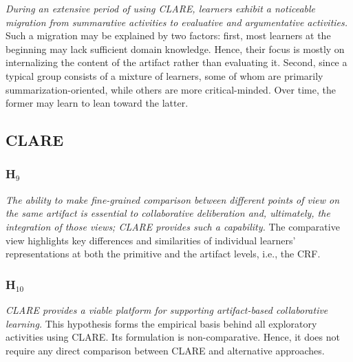 {\it During an extensive period of using CLARE, learners exhibit a
noticeable migration from summarative activities to evaluative and
argumentative activities.} Such a migration may be explained by two
factors: first, most learners at the beginning may lack sufficient domain
knowledge.  Hence, their focus is mostly on internalizing the content of
the artifact rather than evaluating it. Second, since a typical group
consists of a mixture of learners, some of whom are primarily
summarization-oriented, while others are more critical-minded.  Over time,
the former may learn to lean toward the latter.


\subsection{CLARE}
\label{sec:clare hypothesis}

\subsubsection{H\(_9\)}
\label{sec:CLARE1}

{\it The ability to make fine-grained comparison between different points
of view on the same artifact is essential to collaborative deliberation
and, ultimately, the integration of those views; CLARE provides such a
capability.} The comparative view highlights key differences and
similarities of individual learners' representations at both the primitive
and the artifact levels, i.e., the CRF.


\subsubsection{H\(_{10}\)}
\label{sec:CLARE2}

{\it CLARE provides a viable platform for supporting artifact-based
collaborative learning.} This hypothesis forms the empirical basis behind
all exploratory activities using CLARE. Its formulation is non-comparative.
Hence, it does not require any direct comparison between CLARE and
alternative approaches.


